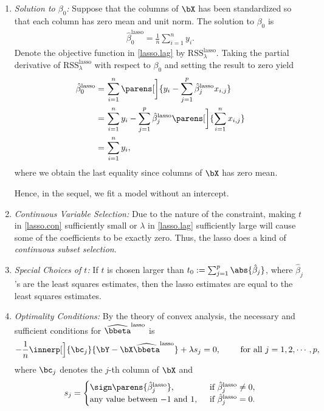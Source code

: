 \documentclass[12pt]{article}
\begin{document}
\begin{enumerate}[label=\textbf{\arabic*.}]
\begin{enumerate}
		\item \textit{Solution to $\beta_0$:} Suppose that the columns of $\bX$ has been standardized so that each column has zero mean and unit norm. The solution to $\beta_0$ is 
		\begin{align*}
			\hat{\beta}_{0}^{\mathrm{lasso}} = \frac{1}{n} \sum_{i=1}^n y_i. 
		\end{align*}
		Denote the objective function in \eqref{lasso.lag} by $\mathrm{RSS}^{\mathrm{lasso}}_{\lambda}$. Taking the partial derivative of $\mathrm{RSS}^{\mathrm{lasso}}_{\lambda}$ with respect to $\beta_0$ and setting the result to zero yield 
		\begin{align*}
			\hat{\beta}_0^{\mathrm{lasso}} = & \, \sum_{i=1}^n \parens[\bigg]{y_i - \sum_{j=1}^p \hat{\beta}_j^{\mathrm{lasso}} x_{i,j}} \\
			= & \, \sum_{i=1}^n y_i - \sum_{j=1}^p \hat{\beta}_j^{\mathrm{lasso}} \parens[\bigg]{\sum_{i=1}^n x_{i,j}} \\
			= & \, \sum_{i=1}^n y_i, 
		\end{align*}
		where we obtain the last equality since columns of $\bX$ has zero mean. 
		
		Hence, in the sequel, we fit a model without an intercept. 
		
		\item \textit{Continuous Variable Selection:} Due to the nature of the constraint, making $t$ in \eqref{lasso.con} sufficiently small or $\lambda$ in \eqref{lasso.lag} sufficiently large will cause some of the coefficients to be exactly zero. Thus, the lasso does a kind of \textit{continuous subset selection}. 
	
		\item \textit{Special Choices of $t$:} If $t$ is chosen larger than $t_0 := \sum_{j=1}^p \abs{\hat{\beta}_j}$, where $\hat{\beta}_j$'s are the least squares estimates, then the lasso estimates are equal to the least squares estimates. 
		
		\item \textit{Optimality Conditions:} By the theory of convex analysis, the necessary and sufficient conditions for $\widehat{\bbeta}^{\mathrm{lasso}}$ is 
		\begin{align*}
			-\frac{1}{n} \innerp[\Big]{\bc_j}{\bY - \bX \widehat{\bbeta}^{\mathrm{lasso}}} + \lambda s_j = 0, \qquad \text{ for all } j = 1, 2, \cdots, p, 
		\end{align*}
		where $\bc_j$ denotes the $j$-th column of $\bX$ and 
		\begin{align*}
			s_j = \begin{cases}
				\sign \parens{\hat{\beta}_j^{\mathrm{lasso}}}, & \, \text{ if } \hat{\beta}_j^{\mathrm{lasso}} \neq 0, \\ 
				\text{any value between $-1$ and $1$}, & \, \text{ if } \hat{\beta}_j^{\mathrm{lasso}} = 0. 
			\end{cases}
		\end{align*}
		

\end{enumerate}
\end{enumerate}
\end{document}
